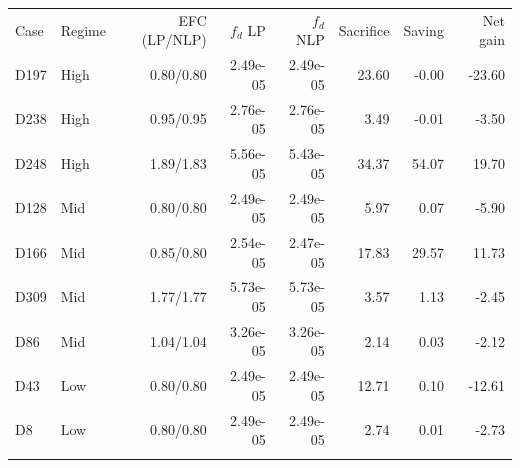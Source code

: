 \begin{tabular}{l l r r r r r r}
\hline\noalign{\smallskip}
Case & Regime & EFC (LP/NLP) & $f_d$ LP & $f_d$ NLP & Sacrifice & Saving & Net gain \\
\noalign{\smallskip}\hline\noalign{\smallskip}
D197 & High & 0.80/0.80 & 2.49e-05 & 2.49e-05 & 23.60 & -0.00 & -23.60 \\
D238 & High & 0.95/0.95 & 2.76e-05 & 2.76e-05 & 3.49 & -0.01 & -3.50 \\
D248 & High & 1.89/1.83 & 5.56e-05 & 5.43e-05 & 34.37 & 54.07 & 19.70 \\
D128 & Mid & 0.80/0.80 & 2.49e-05 & 2.49e-05 & 5.97 & 0.07 & -5.90 \\
D166 & Mid & 0.85/0.80 & 2.54e-05 & 2.47e-05 & 17.83 & 29.57 & 11.73 \\
D309 & Mid & 1.77/1.77 & 5.73e-05 & 5.73e-05 & 3.57 & 1.13 & -2.45 \\
D86 & Mid & 1.04/1.04 & 3.26e-05 & 3.26e-05 & 2.14 & 0.03 & -2.12 \\
D43 & Low & 0.80/0.80 & 2.49e-05 & 2.49e-05 & 12.71 & 0.10 & -12.61 \\
D8 & Low & 0.80/0.80 & 2.49e-05 & 2.49e-05 & 2.74 & 0.01 & -2.73 \\
\noalign{\smallskip}\hline
\end{tabular}